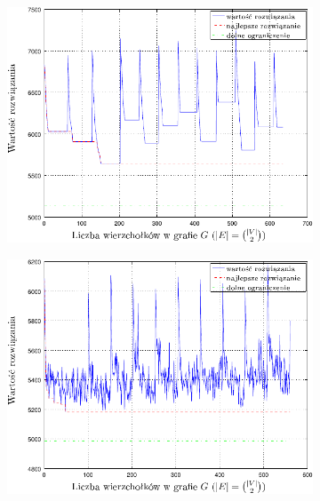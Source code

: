 \begin{figure}[!htbp]
	\renewcommand\figurename{Wykres}
	\null\hfill
	\begin{subfigure}[b]{0.32\textwidth}
		\includegraphics[width=\textwidth]{Chapter_VI/RRIMST5-example/RRIMST5_psfrag}
		\caption{}
		\label{fig:rrimst2:a}
	\end{subfigure}
	\hfill
	\begin{subfigure}[b]{0.32\textwidth}
		\includegraphics[width=\textwidth]{Chapter_VI/RRIMST6-example/RRIMST6_psfrag}
		\caption{}
		\label{fig:rrimst2:b}
	\end{subfigure}
	\hfill
	\begin{subfigure}[b]{0.32\textwidth}

\end{subfigure}
\end{figure}

